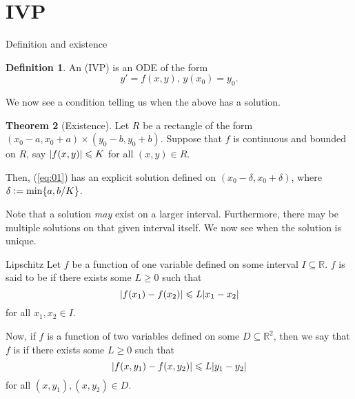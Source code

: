 \documentclass[dvipsnames]{beamer}
\theoremstyle{definition}
\newtheorem{thm}{Theorem}
\newtheorem{defn}[thm]{Definition}
\let\subset\subseteq
\let\ge\geqslant
\let\le\leqslant
\begin{document}
\section{IVP}
\begin{frame}{Definition and existence}
  \begin{defn}
    An  (IVP) is an ODE of the form
    \begin{equation} \label{eq:01}
      y' = f(x, y),\, y(x_{0}) = y_{0}.
    \end{equation}
  \end{defn} \pause
  We now see a condition telling us when the above has a solution. \pause

  \begin{thm}[Existence]
    Let $R$ be a rectangle of the form $(x_{0} - a, x_{0} + a) \times (y_{0} - b, y_{0} + b)$. \pause Suppose that $f$ is continuous and bounded on $R$, \pause say $\md{f(x, y)} \le K$ for all $(x, y) \in R$. \pause

    Then, (\ref{eq:01}) has an explicit solution defined on $(x_{0} - \delta, x_{0} + \delta)$, \pause where $\delta \vcentcolon= \min\{a, b/K\}$. \pause
  \end{thm}
  Note that a solution \emph{may} exist on a larger interval. \pause Furthermore, there may be multiple solutions on that given interval itself. \pause We now see when the solution is unique.
\end{frame}
\begin{frame}{Lipschitz}
  Let $f$ be a function of one variable defined on some interval $I \subset \mathbb{R}$. \pause $f$ is said to be  \pause if there exists some $L \ge 0$ \pause such that
  \begin{equation*} 
    \md{f(x_{1}) - f(x_{2})} \le L \md{x_{1} - x_{2}}
  \end{equation*}
  for all $x_{1}, x_{2} \in I$. \pause

  Now, if $f$ is a function of two variables defined on some $D \subset \mathbb{R}^{2}$, \pause then we say that $f$ is  if \pause there exists some $L \ge 0$ \pause such that
  \begin{equation*} 
    \md{f(x, y_{1}) - f(x, y_{2})} \le L \md{y_{1} - y_{2}}
  \end{equation*}
  for all $(x, y_{1}), (x, y_{2}) \in D$. \pause
\end{frame}
\end{document}
